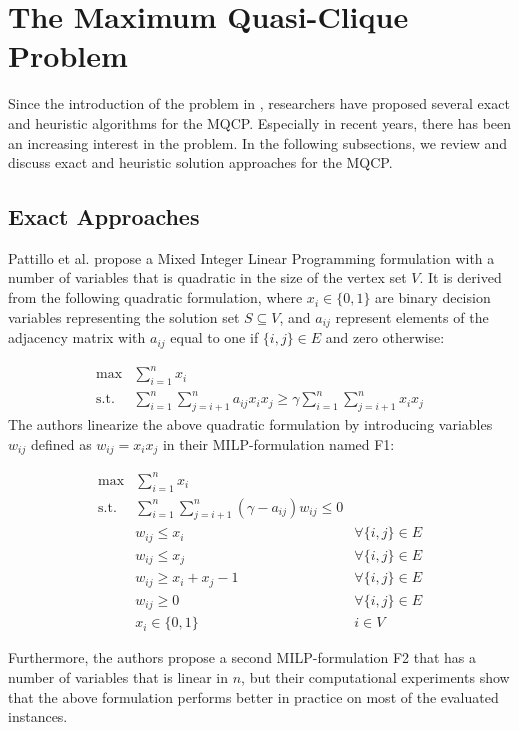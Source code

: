\documentclass[draft,final]{vutinfth} %
\begin{document}
\section{The Maximum Quasi-Clique Problem}\label{sec:mqcp-related-work}

Since the introduction of the problem in \cite{Abello2002}, researchers have proposed several exact and heuristic algorithms for the MQCP. Especially in recent years, there has been an increasing interest in the problem. In the following subsections, we review and discuss exact and heuristic solution approaches for the MQCP. 

\subsection{Exact Approaches}\label{milp-mqcp}
Pattillo et al. \cite{pattillo_maximum_2013} propose a Mixed Integer Linear Programming formulation with a number of variables that is quadratic in the size of the vertex set $V$. 
It is derived from the following quadratic formulation, where $x_i \in \{0,1\}$ are binary decision variables representing the solution set $S \subseteq V$, and $a_{ij}$ represent elements of the adjacency matrix with $a_{ij}$ equal to one if $\{i,j\} \in E$ and zero otherwise: 

\begin{align}
    \max & \sum_{i=1}^{n} x_i  \\
    \text{s.t. } & \sum_{i=1}^n \sum_{j=i+1}^n a_{ij} x_i x_j \geq \gamma \sum_{i=1}^n \sum_{j=i+1}^n x_i x_j 
\end{align}
The authors linearize the above quadratic formulation by introducing variables $w_{ij}$ defined as $w_{ij} = x_i x_j$ in their MILP-formulation named F1: 

\begin{align}
    \max & \sum_{i=1}^n x_i &\\
    \text{s.t. } & \sum_{i=1}^n \sum_{j=i+1}^n (\gamma - a_{ij}) w_{ij} \leq 0  &\\
     & w_{ij} \leq x_i & \forall \{i,j\} \in E\\
     & w_{ij} \leq x_j & \forall \{i, j\} \in E\\
     & w_{ij} \geq x_i + x_j - 1 & \forall \{i, j\} \in E\\
    & w_{ij} \geq 0 & \forall \{i, j\} \in E \\
    & x_i \in \{0,1\} & i \in V
\end{align}

Furthermore, the authors propose a second MILP-formulation F2 that has a number of variables that is linear in $n$, but their computational experiments show that the above formulation performs better in practice on most of the evaluated instances. 
\end{document}
